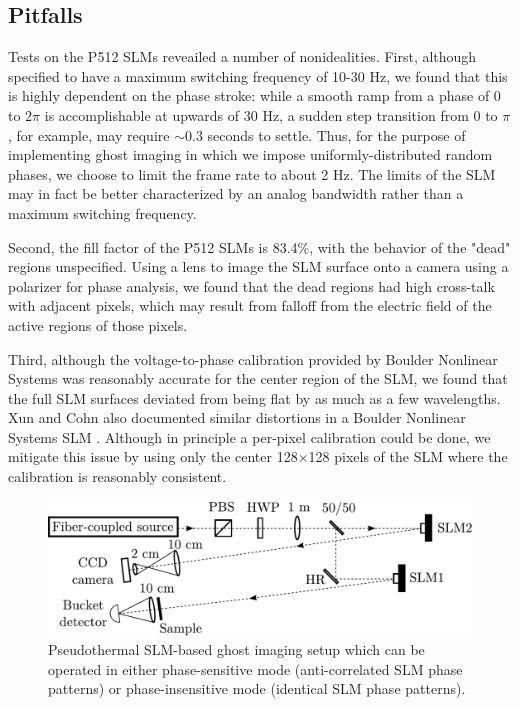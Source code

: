 \subsection{Pitfalls}

Tests on the P512 SLMs reveailed a number of nonidealities. First, although specified to have a maximum switching frequency of 10-30 Hz, we found that this is highly dependent on the phase stroke: while a smooth ramp from a phase of $0$ to $2\pi$ is accomplishable at upwards of 30 Hz, a sudden step transition from $0$ to $\pi$, for example, may require $\sim 0.3$ seconds to settle. Thus, for the purpose of implementing ghost imaging in which we impose uniformly-distributed random phases, we choose to limit the frame rate to about 2 Hz. The limits of the SLM may in fact be better characterized by an analog bandwidth rather than a maximum switching frequency.

Second, the fill factor of the P512 SLMs is 83.4\%, with the behavior of the "dead" regions unspecified. Using a lens to image the SLM surface onto a camera using a polarizer for phase analysis, we found that the dead regions had high cross-talk with adjacent pixels, which may result from falloff from the electric field of the active regions of those pixels.

Third, although the voltage-to-phase calibration provided by Boulder Nonlinear Systems was reasonably accurate for the center region of the SLM, we found that the full SLM surfaces deviated from being flat by as much as a few wavelengths. Xun and Cohn also documented similar distortions in a Boulder Nonlinear Systems SLM \cite{xun-phase}. Although in principle a per-pixel calibration could be done, we mitigate this issue by using only the center 128$\times$128 pixels of the SLM where the calibration is reasonably consistent.

\begin{figure}[t]
\begin{center}
\includegraphics[width=13cm]{figure-ghost-setup.pdf}
\caption{Pseudothermal SLM-based ghost imaging setup which can be operated in either phase-sensitive mode (anti-correlated SLM phase patterns) or phase-insensitive mode (identical SLM phase patterns).}
\label{figure:ghost-setup}
\end{center}
\end{figure}


